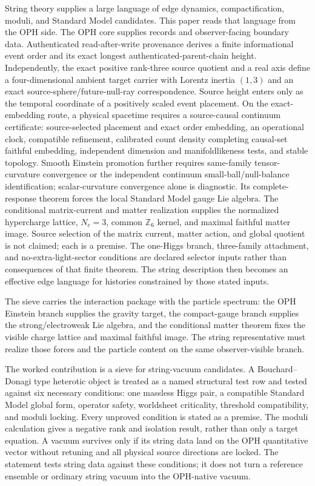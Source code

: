 \documentclass[11pt]{article}
\theoremstyle{remark}
\theoremstyle{plain}
\begin{document}
String theory supplies a large language of edge dynamics, compactification,
moduli, and Standard Model candidates. This paper reads that language from the
OPH side. The OPH core supplies records and observer-facing boundary data.
Authenticated read-after-write provenance derives a finite informational event
order and its exact longest authenticated-parent-chain height. Independently, the exact
positive rank-three source quotient and a real axis define a four-dimensional ambient target
carrier with Lorentz inertia \((1,3)\) and an exact source-sphere/future-null-ray
correspondence. Source height enters only as the temporal coordinate of a
positively scaled event placement. On the exact-embedding route, a physical
spacetime requires a source-causal continuum certificate: source-selected
placement and exact order embedding,
an operational clock, compatible refinement, calibrated count density
completing causal-set faithful embedding, independent dimension and
manifoldlikeness tests, and stable topology. Smooth Einstein promotion further
requires same-family tensor-curvature convergence or the independent continuum
small-ball/null-balance identification; scalar-curvature convergence alone is
diagnostic. Its
complete-response theorem forces the local Standard Model gauge Lie algebra.
The conditional matrix-current and matter realization supplies the
normalized hypercharge lattice, \(N_c=3\), common \(\mathbb Z_6\) kernel, and
maximal faithful matter image. Source selection of the matrix current, matter
action, and global quotient is not claimed; each is a premise. The one-Higgs
branch, three-family attachment, and no-extra-light-sector conditions are declared selector
inputs rather than consequences of that finite theorem. The string description then becomes an
effective edge language for histories constrained by those stated inputs.

The sieve carries the interaction package with the particle spectrum:
the OPH Einstein branch supplies the gravity target, the compact-gauge branch supplies the
strong/electroweak Lie algebra, and the conditional matter theorem fixes the visible
charge lattice and maximal faithful image.
The string representative must realize those forces and the particle content on the same
observer-visible branch.

The worked contribution is a sieve for string-vacuum candidates. A
Bouchard--Donagi type heterotic object is treated as a named structural test row and
tested against six necessary conditions: one massless Higgs pair, a compatible Standard Model global form,
operator safety, worldsheet criticality, threshold compatibility, and moduli locking. Every
unproved condition is stated as a premise. The moduli calculation gives a negative rank and isolation result,
rather than only a target equation. A vacuum survives only if its string data land on the OPH
quantitative vector without retuning and all physical source directions are locked. The statement
tests string data against these conditions; it
does not turn a reference ensemble or ordinary string vacuum into the OPH-native vacuum.
\end{document}
